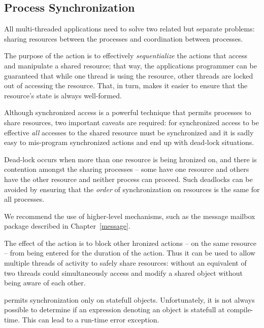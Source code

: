 \subsection{Process Synchronization}
\label{action:sync}

All multi-threaded applications need to solve two related but separate problems: sharing resources between the processes and coordination between processes.


The purpose of the  action is to effectively \emph{sequentialize} the actions that access and manipulate a shared resource; that way, the applications programmer can be guaranteed that while one thread is using the resource, other threads are locked out of accessing the resource. That, in turn, makes it easier to ensure that the resource's state is always well-formed.

\begin{aside}
Although synchronized access is a powerful technique that permits processes to share resources, two important caveats are required: for synchronized access to be effective \emph{all} accesses to the shared resource must be synchronized and it is sadly easy to mis-program synchronized actions and end up with dead-lock situations.

Dead-lock occurs when more than one resource is being hr\-o\-ni\-zed on, and there is contention amongst the sharing processes -- some have one resource and others have the other resource and neither process can proceed. Such deadlocks can be avoided by ensuring that the \emph{order} of synchronization on resources is the same for all processes.

We recommend the use of higher-level mechanisms, such as the message mailbox package  described in Chapter~\vref{message}.
\end{aside}

\noindent
The effect of the  action is to block other hronized actions -- on the same resource -- from being entered for the duration of the  action. Thus it can be used to allow multiple threads of activity to safely share resources: without an equivalent of  two threads could simultaneously access and modify a shared object without being aware of each other.

\begin{aside}
\go permits synchronization only on statefull objects. Unfortunately, it is not always possible to determine if an expression denoting an object is statefull at compile-time. This can lead to a run-time error exception.
\end{aside}

